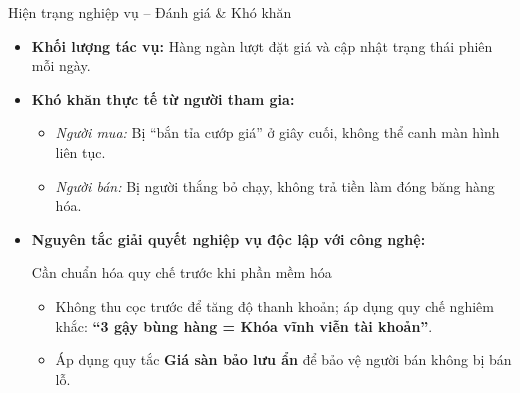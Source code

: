 \documentclass[aspectratio=169, 10pt]{beamer}
\begin{document}
\begin{frame}{Hiện trạng nghiệp vụ -- Đánh giá \& Khó khăn}
    \begin{itemize}
        \item \textbf{Khối lượng tác vụ:} Hàng ngàn lượt đặt giá và cập nhật trạng thái phiên mỗi ngày.
        \item \textbf{Khó khăn thực tế từ người tham gia:}
        \begin{itemize}
            \item \textit{Người mua:} Bị ``bắn tỉa cướp giá'' ở giây cuối, không thể canh màn hình liên tục.
            \item \textit{Người bán:} Bị người thắng bỏ chạy, không trả tiền làm đóng băng hàng hóa.
        \end{itemize}
        \vspace{0.2cm}
        \item \textbf{Nguyên tắc giải quyết nghiệp vụ độc lập với công nghệ:}
        \begin{alertblock}{Cần chuẩn hóa quy chế trước khi phần mềm hóa}
            \begin{itemize}
                \item Không thu cọc trước để tăng độ thanh khoản; áp dụng quy chế nghiêm khắc: \textbf{``3 gậy bùng hàng = Khóa vĩnh viễn tài khoản''}.
                \item Áp dụng quy tắc \textbf{Giá sàn bảo lưu ẩn} để bảo vệ người bán không bị bán lỗ.
            \end{itemize}
        \end{alertblock}
    \end{itemize}
\end{frame}
\end{document}

